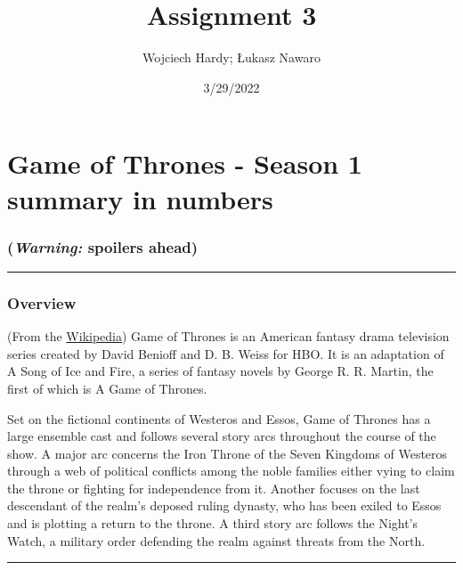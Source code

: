 \documentclass[
]{article}
\title{Assignment 3}
\author{Wojciech Hardy; Łukasz Nawaro}
\date{3/29/2022}
\begin{document}
\maketitle

\hypertarget{game-of-thrones---season-1-summary-in-numbers}{%
\section{Game of Thrones - Season 1 summary in
numbers}\label{game-of-thrones---season-1-summary-in-numbers}}

\hypertarget{warning-spoilers-ahead}{%
\subsubsection{\texorpdfstring{\textbf{(\emph{Warning:} spoilers
ahead)}}{(Warning: spoilers ahead)}}\label{warning-spoilers-ahead}}

\begin{center}\rule{0.5\linewidth}{0.5pt}\end{center}

\hypertarget{overview}{%
\subsubsection{Overview}\label{overview}}

(From the
\href{https://en.wikipedia.org/wiki/Game_of_Thrones\#Premise}{Wikipedia})
Game of Thrones is an American fantasy drama television series created
by David Benioff and D. B. Weiss for HBO. It is an adaptation of A Song
of Ice and Fire, a series of fantasy novels by George R. R. Martin, the
first of which is A Game of Thrones.

Set on the fictional continents of Westeros and Essos, Game of Thrones
has a large ensemble cast and follows several story arcs throughout the
course of the show. A major arc concerns the Iron Throne of the Seven
Kingdoms of Westeros through a web of political conflicts among the
noble families either vying to claim the throne or fighting for
independence from it. Another focuses on the last descendant of the
realm's deposed ruling dynasty, who has been exiled to Essos and is
plotting a return to the throne. A third story arc follows the Night's
Watch, a military order defending the realm against threats from the
North.

\begin{center}\rule{0.5\linewidth}{0.5pt}\end{center}
\end{document}
